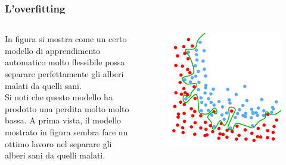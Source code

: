 \begin{frame}

	\frametitle{L'overfitting}

	\begin{columns}
			In figura si mostra come un certo modello di apprendimento automatico molto flessibile possa separare perfettamente gli alberi malati da quelli sani.\\
			Si noti che questo modello ha prodotto una perdita molto molto bassa.
			\newlinedouble
			A prima vista, il modello mostrato in figura sembra fare un ottimo lavoro nel separare gli alberi sani da quelli malati.


			\begin{figure}[!htbp]
				\centering
				\includegraphics[width=1.0\linewidth]{images/supervised/validation_test_training_peril_of_overfitting/overfitting_green_line.pdf}
			\end{figure}

	\end{columns}
\end{frame}


